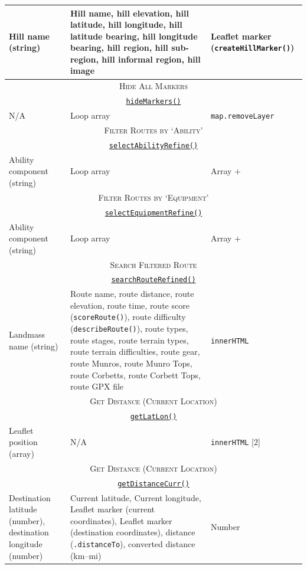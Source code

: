 \documentclass[11pt, english]{article}
\begin{document}
\begin{center}
\begin{longtable}{p{4cm}p{6cm}p{2cm}}
		Hill name (string) & Hill name, hill elevation, hill latitude, hill longitude, hill latitude bearing, hill longitude bearing, hill region, hill sub-region, hill informal region, hill image & Leaflet marker (\texttt{createHillMarker()})\\
		\hline
		\multicolumn{3}{c}{\textsc{Hide All Markers}}\\
		\hline
		\multicolumn{3}{c}{\underline{\texttt{hideMarkers()}}}\\
		N/A & Loop array & \texttt{map.removeLayer}\\
		\hline
		\multicolumn{3}{c}{\textsc{Filter Routes by `Ability'}}\\
		\hline
		\multicolumn{3}{c}{\underline{\texttt{selectAbilityRefine()}}}\\
		Ability component (string) & Loop array & Array $+$\\
		\hline
		\multicolumn{3}{c}{\textsc{Filter Routes by `Equipment'}}\\
		\hline
		\multicolumn{3}{c}{\underline{\texttt{selectEquipmentRefine()}}}\\
		Ability component (string) & Loop array & Array $+$\\
		\hline
		\multicolumn{3}{c}{\textsc{Search Filtered Route}}\\
		\hline
		\multicolumn{3}{c}{\underline{\texttt{searchRouteRefined()}}}\\
		Landmass name (string) & Route name, route distance, route elevation, route time, route score (\texttt{scoreRoute()}), route difficulty (\texttt{describeRoute()}), route types, route stages, route terrain types, route terrain difficulties, route gear, route Munros, route Munro Tops, route Corbetts, route Corbett Tops, route GPX file & \texttt{innerHTML}\\
		\hline
		\multicolumn{3}{c}{\textsc{Get Distance (Current Location)}}\\
		\hline
		\multicolumn{3}{c}{\underline{\texttt{getLatLon()}}}\\
		Leaflet position (array) & N/A & \texttt{innerHTML} [2]\\
		\hline
		\multicolumn{3}{c}{\textsc{Get Distance (Current Location)}}\\
		\hline
		\multicolumn{3}{c}{\underline{\texttt{getDistanceCurr()}}}\\
		Destination latitude (number), destination longitude (number) & Current latitude, Current longitude, Leaflet marker (current coordinates), Leaflet marker (destination coordinates), distance (\texttt{.distanceTo}), converted distance (km--mi) & Number\\

\end{longtable}
\end{center}
\end{document}

